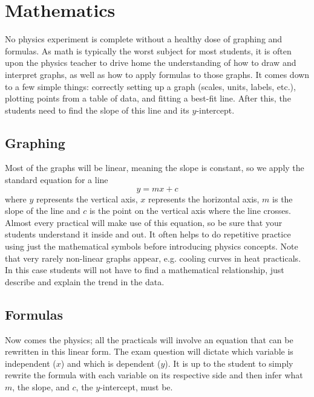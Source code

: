 

\section{Mathematics} 

No physics experiment is complete without a healthy dose of graphing and
formulas. As math is typically the worst subject for most students, it is often upon the
physics teacher to drive home the understanding of how to draw and interpret graphs, as
well as how to apply formulas to those graphs. It comes down to a few simple things:
correctly setting up a graph (scales, units, labels, etc.), plotting points from a table of
data, and fitting a best-fit line. After this, the students need to find the slope of this line
and its $y$-intercept.

\subsection{Graphing}
Most of the graphs will be linear, meaning the slope is constant, so we apply the standard
equation for a line
$$y=mx + c$$
where $y$ represents the vertical axis, $x$ represents the horizontal axis, $m$ is the slope of the line and $c$ is the point on the vertical axis where the line crosses. Almost every practical will make use of this equation, so be sure that your students understand it inside and out. It often helps to do repetitive practice using just the mathematical symbols before introducing physics concepts. Note that very rarely non-linear graphs appear, e.g. cooling curves in heat practicals. In this case students will not have to find a mathematical relationship, just describe and explain the trend in the data.

\subsection{Formulas}
Now comes the physics; all the practicals will involve an equation that can be
rewritten in this linear form. The exam question will dictate which variable is
independent ($x$) and which is dependent ($y$). It is up to the student to simply rewrite the
formula with each variable on its respective side and then infer what $m$, the slope, and $c$,
the $y$-intercept, must be.

